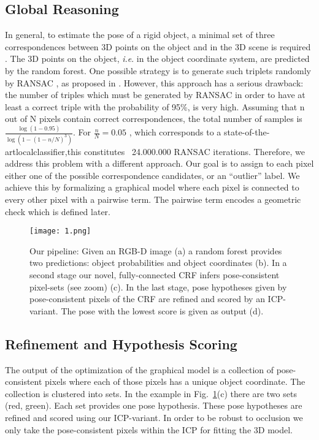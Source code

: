 \documentclass[10pt,twocolumn,a4paper]{article}
\begin{document}
  \subsection{Global Reasoning}
   In general, to estimate the pose of a rigid object, a minimal set of three correspondences
   between 3D points on the object and in the 3D scene is required .
   The 3D points on the object, \emph{i.e}. in the object coordinate system,
   are predicted by the random forest. One possible strategy is to generate such triplets
   randomly by RANSAC \cite{fischler1987random}, as proposed in \cite{brachmann2014learning}. However, this approach
   has a serious drawback: the number of triples which must be generated by RANSAC
    in order to have at least a correct triple with the probability of 95\%, is very high.
   Assuming that n out of N pixels contain correct correspondences, 
   the total number of samples is   $\frac{\log\left(1-0.95\right)}{\log\left(1-{\left( 1-n/N \right)}^3\right)}$. 
   For $\frac{n}{N}=0.05$ ,
   which corresponds to a state-of-the-artlocalclassiﬁer,this constitutes ~24.000.000 RANSAC iterations.
   Therefore, we address this problem with a different approach.
   Our goal is to assign to each pixel either one of the possible correspondence
   candidates, or an “outlier” label. We achieve this by formalizing a graphical
    model where each pixel is connected to every other pixel with a pairwise term. The pairwise term encodes a geometric check which is deﬁned later.
    
   \begin{figure}
  \centering
  \texttt{[image: 1.png]}
  \caption{Our pipeline: Given an RGB-D image (a) a random forest provides two predictions: object probabilities and object coordinates (b). In a second stage our novel, fully-connected CRF infers pose-consistent pixel-sets (see zoom) (c). In the last stage, pose hypotheses given by pose-consistent pixels of the CRF are reﬁned and scored by an ICP-variant. The pose with the lowest score is given as output (d).
}
\label{fig1}
\end{figure}

  \subsection{Reﬁnement and Hypothesis Scoring}
  The output of the optimization of the graphical model is a collection of
  pose-consistent pixels where each of those pixels has a unique object coordinate.
  The collection is clustered into sets. In the example in Fig.~\ref{fig1}(c)
  there are two sets (red, green). Each set provides one pose hypothesis.
  These pose hypotheses are reﬁned and scored using our ICP-variant.
  In order to be robust to occlusion we only take the pose-consistent pixels within the ICP \cite{rusu20113d}
   for ﬁtting the 3D model.

  {\small


}
 
\end{document}
